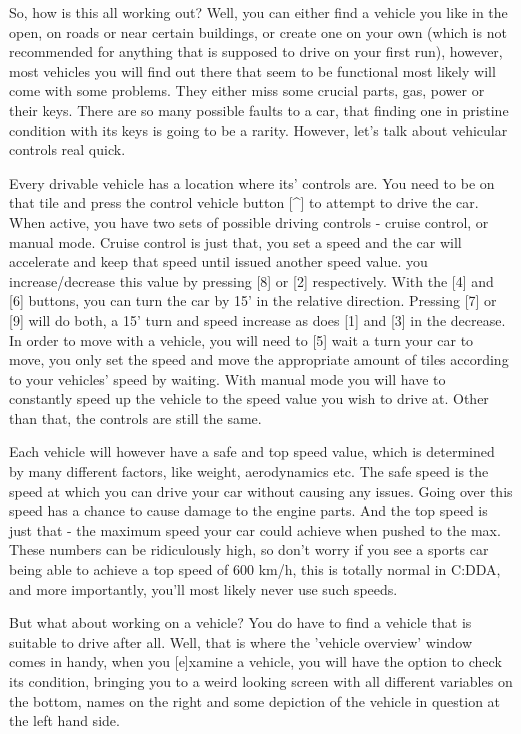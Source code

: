 So, how is this all working out? Well, you can either find a vehicle you like in the open, on roads or near certain buildings, or create one on your own (which is not recommended for anything that is supposed to drive on your first run), however, most vehicles you will find out there that seem to be functional most likely will come with some problems. They either miss some crucial parts, gas, power or their keys. There are so many possible faults to a car, that finding one in pristine condition with its keys is going to be a rarity. However, let's talk about vehicular controls real quick.

Every drivable vehicle has a location where its' controls are. You need to be on that tile and press the control vehicle button [\^{}] to attempt to drive the car. When active, you have two sets of possible driving controls - cruise control, or manual mode. Cruise control is just that, you set a speed and the car will accelerate and keep that speed until issued another speed value. you increase/decrease this value by pressing [8] or [2] respectively. With the [4] and [6] buttons, you can turn the car by 15' in the relative direction. Pressing [7] or [9] will do both, a 15' turn and speed increase as does [1] and [3] in the decrease. In order to move with a vehicle, you will need to [5] wait a turn your car to move, you only set the speed and move the appropriate amount of tiles according to your vehicles' speed by waiting. With manual mode you will have to constantly speed up the vehicle to the speed value you wish to drive at. Other than that, the controls are still the same.

Each vehicle will however have a safe and top speed value, which is determined by many different factors, like weight, aerodynamics etc. The safe speed is the speed at which you can drive your car without causing any issues. Going over this speed has a chance to cause damage to the engine parts. And the top speed is just that - the maximum speed your car could achieve when pushed to the max. These numbers can be ridiculously high, so don't worry if you see a sports car being able to achieve a top speed of 600 km/h, this is totally normal in C:DDA, and more importantly, you'll most likely never use such speeds.

But what about working on a vehicle? You do have to find a vehicle that is suitable to drive after all. Well, that is where the 'vehicle overview' window comes in handy, when you [e]xamine a vehicle, you will have the option to check its condition, bringing you to a weird looking screen with all different variables on the bottom, names on the right and some depiction of the vehicle in question at the left hand side.

